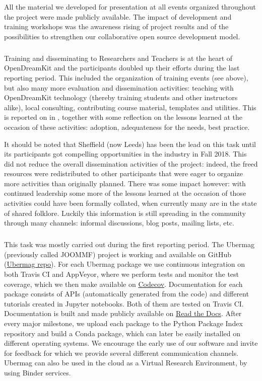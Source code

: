 {All the material we developed for presentation at all events organized throughout the project were made publicly available. The impact of development and training workshops was the awareness rising of project results and of the possibilities to strengthen our collaborative open source development model.
\smallskip
\subparagraph{}

Training and disseminating to Researchers and Teachers is at the heart
of OpenDreamKit and the participants doubled up their efforts during
the last reporting period. This included the organization of training
events (see  above), but also many
more evaluation and dissemination activities: teaching with
OpenDreamKit technology (thereby training students and other
instructors alike), local consulting, contributing course material,
templates and utilities. This is reported on in
, together with some reflection on the
lessons learned at the occasion of these activities: adoption,
adequateness for the needs, best practice.

It should be noted that Sheffield (now Leeds) has been the lead on
this task until its participants got compelling opportunities in the
industry in Fall 2018. This did not reduce the overall dissemination
activities of the project: indeed, the freed resources were
redistributed to other participants that were eager to organize more
activities than originally planned. There was some impact however:
with continued leadership some more of the lessons learned at the
occasion of those activities could have been formally collated, when
currently many are in the state of shared folklore. Luckily this
information is still spreading in the community through many channels:
informal discussions, blog posts, mailing lists, etc.

\smallskip
\subparagraph{}
\label{dissem@dissemination-of-oommf-nb-virtual-environment}

This task was mostly carried out during the first reporting period. The Ubermag
(previously called JOOMMF) project is working and available on GitHub
(\href{https://github.com/ubermag}{Ubermag repo}). For each Ubermag
package we use continuous integration on both Travis CI and AppVeyor,
where we perform tests and monitor the test coverage, which we then
make available on \href{https://codecov.io/}{Codecov}. Documentation
for each package consists of APIs (automatically generated from the
code) and different tutorials created in Jupyter notebooks. Both of
them are tested on Travis CI. Documentation is built and made publicly
available on \href{http://discretisedfield.readthedocs.io}{Read the
  Docs}. After every major milestone, we upload each package to the
Python Package Index repository and build a Conda package, which can
later be easily installed on different operating systems. We encourage
the early use of our software and invite for feedback for which we
provide several different communication channels. Ubermag can also be
used in the cloud as a Virtual Research Environment, by using Binder
services.

}
